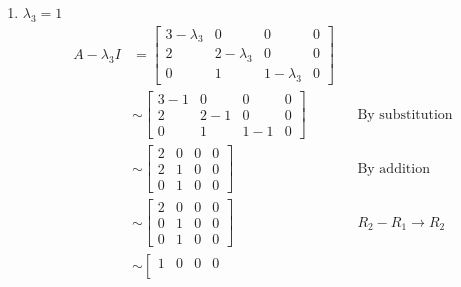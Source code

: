 \documentclass[10pt,letterpaper,final]{report}
\newcommand{\reason}[1]{&& \text{#1}}
\begin{document}
\begin{enumerate}[label=(\alph*)]
\begin{enumerate}
          \item $\lambda_3 = 1$
                \begin{align*}
                  A - \lambda_3 I & = \left[\begin{array}{rrr|r}
                                          3 - \lambda_3 & 0             & 0             & 0 \\
                                          2             & 2 - \lambda_3 & 0             & 0 \\
                                          0             & 1             & 1 - \lambda_3 & 0
                                        \end{array}\right]     \\[1ex]
                                  & \sim \left[\begin{array}{rrr|r}
                                             3 - 1 & 0     & 0     & 0 \\
                                             2     & 2 - 1 & 0     & 0 \\
                                             0     & 1     & 1 - 1 & 0
                                           \end{array}\right] \reason{By substitution}          \\[1ex]
                                  & \sim \left[\begin{array}{rrr|r}
                                             2 & 0 & 0 & 0 \\
                                             2 & 1 & 0 & 0 \\
                                             0 & 1 & 0 & 0
                                           \end{array}\right] \reason{By addition}              \\[1ex]
                                  & \sim \left[\begin{array}{rrr|r}
                                             2 & 0 & 0 & 0 \\
                                             0 & 1 & 0 & 0 \\
                                             0 & 1 & 0 & 0
                                           \end{array}\right] \reason{$R_2 - R_1 \to R_2$}      \\[1ex]
                                  & \sim \left[\begin{array}{rrr|r}
                                             1 & 0 & 0 & 0 \\

\end{array}
\end{align*}
\end{enumerate}
\end{enumerate}
\end{document}
